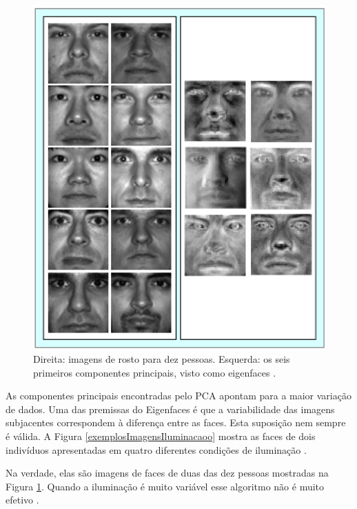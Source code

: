 	\begin{figure}[hbt]
		\begin{center}
			\includegraphics[width=12cm]{figuras/2.FundamentacaoTeorica/eigenfaces.png}
		\end{center}
		\caption{Direita: imagens de rosto para dez pessoas. Esquerda: os seis primeiros componentes principais, visto como eigenfaces \cite{hewitt}.}
		\label{exemploEigenfaces}
	\end{figure}

As componentes principais encontradas pelo PCA apontam para a maior variação de dados. Uma das premissas do Eigenfaces é que a variabilidade das imagens subjacentes correspondem à diferença entre as faces. Esta suposição nem sempre é válida. A Figura \ref{exemplosImagensIluminacaoo} mostra as faces de dois indivíduos apresentadas em quatro diferentes condições de iluminação \cite{hewitt}.

Na verdade, elas são imagens de faces de duas das dez pessoas mostradas na Figura \ref{exemploEigenfaces}. Quando a iluminação é muito variável esse algoritmo não é muito efetivo \cite{hewitt}.

